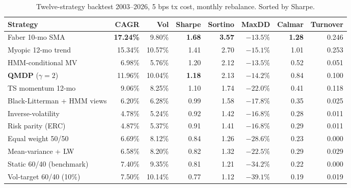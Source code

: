 \documentclass[11pt]{article}
\theoremstyle{plain1}
\theoremstyle{definition1}
\newcommand{\1}{\mathbf{1}}
\begin{document}
\begin{table}[H]\centering
\caption{Twelve-strategy backtest 2003--2026, 5 bps tx cost, monthly rebalance. Sorted by Sharpe.}
\label{tab:horserace}
\small
\setlength{\tabcolsep}{4pt}
\begin{tabular}{l rrrrrrr}
\toprule
\textbf{Strategy} & \textbf{CAGR} & \textbf{Vol} & \textbf{Sharpe} & \textbf{Sortino} & \textbf{MaxDD} & \textbf{Calmar} & \textbf{Turnover} \\
\midrule
Faber 10-mo SMA          & \textbf{17.24\%} & 9.80\%  & \textbf{1.68} & \textbf{3.57} & $-13.5\%$ & \textbf{1.28} & 0.246 \\
Myopic 12-mo trend       & 15.34\%          & 10.57\% & 1.41          & 2.70          & $-15.1\%$ & 1.01          & 0.253 \\
HMM-conditional MV       & 6.98\%           & 5.76\%  & 1.20          & 2.12          & $-13.5\%$ & 0.52          & 0.051 \\
\textbf{QMDP} ($\gamma{=}2$) & 11.96\%      & 10.04\% & \textbf{1.18} & 2.13          & $-14.2\%$ & 0.84          & 0.100 \\
TS momentum 12-mo        & 9.06\%           & 8.25\%  & 1.10          & 1.74          & $-22.0\%$ & 0.41          & 0.118 \\
Black-Litterman + HMM views & 6.20\%        & 6.28\%  & 0.99          & 1.58          & $-17.8\%$ & 0.35          & 0.025 \\
Inverse-volatility       & 4.78\%           & 5.24\%  & 0.92          & 1.42          & $-16.8\%$ & 0.28          & 0.011 \\
Risk parity (ERC)        & 4.87\%           & 5.37\%  & 0.91          & 1.41          & $-16.8\%$ & 0.29          & 0.011 \\
Equal weight 50/50       & 6.69\%           & 8.12\%  & 0.84          & 1.26          & $-28.6\%$ & 0.23          & 0.000 \\
Mean-variance + LW       & 6.58\%           & 8.20\%  & 0.82          & 1.32          & $-22.5\%$ & 0.29          & 0.029 \\
Static 60/40 (benchmark) & 7.40\%           & 9.35\%  & 0.81          & 1.21          & $-34.2\%$ & 0.22          & 0.000 \\
Vol-target 60/40 (10\%)  & 7.50\%           & 10.14\% & 0.77          & 1.12          & $-39.1\%$ & 0.19          & 0.019 \\
\bottomrule
\end{tabular}
\end{table}
\end{document}
